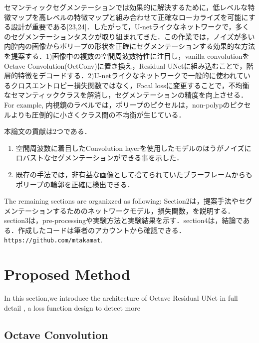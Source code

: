 \documentclass{article}
\begin{document}
セマンティックセグメンテーションでは効果的に解決するために，低レベルな特徴マップを高レベルの特徴マップと組み合わせて正確なローカライズを可能にする設計が重要である[23,24]．したがって，U-netライクなネットワークで，多くのセグメンテーションタスクが取り組まれてきた．この作業では，ノイズが多い内腔内の画像からポリープの形状を正確にセグメンテーションする効果的な方法を提案する．\(1)\)画像中の複数の空間周波数特性に注目し，vanilla convolutionをOctave Convolution(OctConv)に置き換え，Residual UNetに組み込むことで，階層的特徴をデコードする．\(2)\)U-netライクなネットワークで一般的に使われているクロスエントロピー損失関数ではなく，Focal lossに変更することで，不均衡なセマンティッククラスを解消し，セグメンテーションの精度を向上させる．For example, 内視鏡のラベルでは，ポリープのピクセルは，non-polypのピクセルよりも圧倒的に小さくクラス間の不均衡が生じている．

本論文の貢献は2つである．
\begin{enumerate}[(1)]
\item 空間周波数に着目したConvolution layerを使用したモデルのほうがノイズにロバストなセグメンテーションができる事を示した．
\item 既存の手法では，非有益な画像として捨てられていたブラーフレームからもポリープの輪郭を正確に検出できる．
\end{enumerate}

The remaining sections are organixzed as following: Section2は，提案手法やセグメンテーションするためのネットワークモデル，損失関数，を説明する．section3は，pre-processingや実験方法と実験結果を示す．section4は，結論である．作成したコードは筆者のアカウントから確認できる．\texttt{https://github.com/mtakamat}.

\section{Proposed Method}
In this section,we introduce the architecture of Octave Residual UNet in full detail , a loss function design to detect more 
\label{sec:pro}
\subsection{Octave Convolution}
\end{document}
